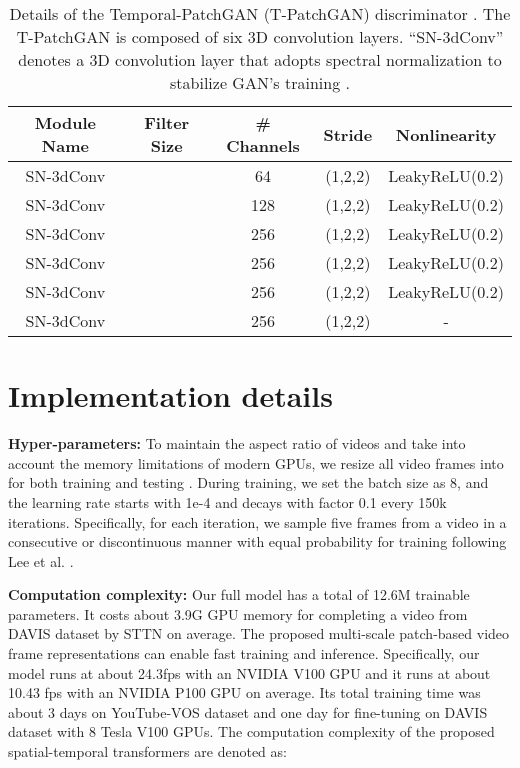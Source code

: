 \documentclass[runningheads]{llncs}
\begin{document}
 \begin{table}
    \begin{center}
    \begin{tabular}{c|c|c|c|c} 
    Module Name &Filter Size &\# Channels &Stride &Nonlinearity \\\hline\hline
    SN-3dConv & &64 &(1,2,2) &LeakyReLU(0.2) \\ 
    SN-3dConv & &128 &(1,2,2) &LeakyReLU(0.2) \\ 
    SN-3dConv & &256 &(1,2,2) &LeakyReLU(0.2) \\ 
    SN-3dConv & &256 &(1,2,2) &LeakyReLU(0.2) \\ 
    SN-3dConv & &256 &(1,2,2) &LeakyReLU(0.2) \\ 
    SN-3dConv & &256 &(1,2,2) &-\\ \hline
    \end{tabular} 
     \end{center}
    \caption{Details of the Temporal-PatchGAN (T-PatchGAN) discriminator \cite{chang2019free}. The T-PatchGAN is composed of six 3D convolution layers. ``SN-3dConv'' denotes a 3D convolution layer that adopts spectral normalization to stabilize GAN's training \cite{chang2019free}.}
    \label{tb:dis}
    \end{table}   


\section{Implementation details}
\label{sec:imp}

\textbf{Hyper-parameters:}
To maintain the aspect ratio of videos and take into account the memory limitations of modern GPUs, we resize all video frames into  for both training and testing \cite{huang2016temporally,kim2019deep,lee2019copy,xu2019deep}. During training, we set the batch size as 8, and the learning rate starts with 1e-4 and decays with factor 0.1 every 150k iterations. Specifically, for each iteration, we sample five frames from a video in a consecutive or discontinuous manner with equal probability for training following Lee et al. \cite{lee2019copy,oh2019onion}. 


\textbf{Computation complexity:} Our full model has a total of 12.6M trainable parameters. It costs about 3.9G GPU memory for completing a video from DAVIS dataset \cite{caelles20182018} by STTN on average. 
The proposed multi-scale patch-based video frame representations can enable fast training and inference. Specifically, our model runs at about 24.3fps with an NVIDIA V100 GPU and it runs at about 10.43 fps with an NVIDIA P100 GPU on average. Its total training time was about 3 days on YouTube-VOS dataset \cite{xu2018youtube} and one day for fine-tuning on DAVIS dataset \cite{caelles20182018} with 8 Tesla V100 GPUs. 
The computation complexity of the proposed spatial-temporal transformers are denoted as: 
\end{document}
